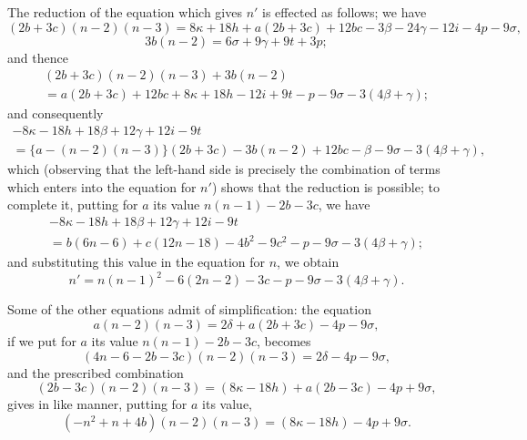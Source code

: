 \documentclass[11pt,a4paper]{book}
\begin{document}
The reduction of the equation which gives $n'$ is effected as follows; we have
\[
(2b+3c)(n-2)(n-3)=8\kappa+18h+a(2b+3c)+12bc-3\beta-24\gamma-12i-4p-9\sigma,
\]
\[
3b(n-2)=6\sigma+9\gamma+9t+3p;
\]
and thence
\begin{multline*}
(2b+3c)(n-2)(n-3)+3b(n-2)\\
=a(2b+3c)+12bc+8\kappa+18h-12i+9t-p-9\sigma-3(4\beta+\gamma);
\end{multline*}
and consequently
\begin{multline*}
-8\kappa-18h+18\beta+12\gamma+12i-9t\\
=\{a-(n-2)(n-3)\}(2b+3c)-3b(n-2)+12bc-\beta-9\sigma-3(4\beta+\gamma),
\end{multline*}
which (observing that the left-hand side is precisely the combination of terms which enters into the equation for $n'$) shows that the reduction is possible; to complete it, putting for $a$ its value $n(n-1)-2b-3c$, we have
\begin{multline*}
-8\kappa-18h+18\beta+12\gamma+12i-9t\\
=b(6n-6)+c(12n-18)-4b^2-9c^2-p-9\sigma-3(4\beta+\gamma);
\end{multline*}
and substituting this value in the equation for $n$, we obtain
\[
n'=n(n-1)^2-6(2n-2)-3c-p-9\sigma-3(4\beta+\gamma).
\]

Some of the other equations admit of simplification: the equation
\[
a(n-2)(n-3)=2\delta+a(2b+3c)-4p-9\sigma,
\]
if we put for $a$ its value $n(n-1)-2b-3c$, becomes
\[
(4n-6-2b-3c)(n-2)(n-3)=2\delta-4p-9\sigma,
\]
and the prescribed combination
\[
(2b-3c)(n-2)(n-3)=(8\kappa-18h)+a(2b-3c)-4p+9\sigma,
\]
gives in like manner, putting for $a$ its value,
\[
(-n^2+n+4b)(n-2)(n-3)=(8\kappa-18h)-4p+9\sigma.
\]
\end{document}
